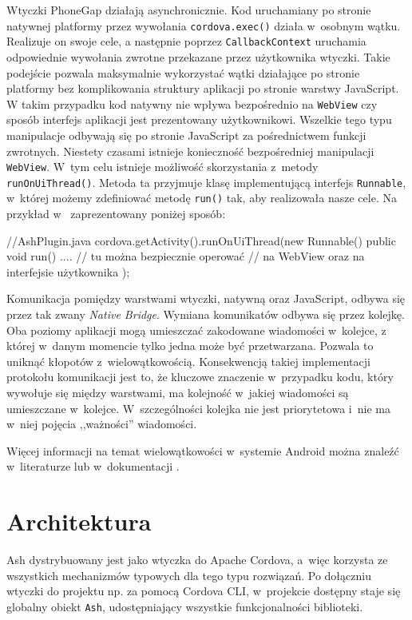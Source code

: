 \documentclass{xmgr}
\begin{document}
Wtyczki PhoneGap działają asynchronicznie. Kod uruchamiany po stronie natywnej platformy przez wywołania \texttt{cordova.exec()} działa w~osobnym wątku. Realizuje on swoje cele, a następnie poprzez \texttt{CallbackContext} uruchamia odpowiednie wywołania zwrotne przekazane przez użytkownika wtyczki. Takie podejście pozwala maksymalnie wykorzystać wątki działające po stronie platformy bez komplikowania struktury aplikacji po stronie warstwy JavaScript. W takim przypadku kod natywny nie wpływa bezpośrednio na \texttt{WebView} czy sposób interfejs aplikacji jest prezentowany użytkownikowi. Wszelkie tego typu manipulacje odbywają się po stronie JavaScript za pośrednictwem funkcji zwrotnych. Niestety czasami istnieje konieczność bezpośredniej manipulacji \texttt{WebView}. W~tym celu istnieje możliwość skorzystania z~metody \texttt{runOnUiThread()}. Metoda ta przyjmuje klasę implementującą interfejs \texttt{Runnable}, w~której możemy zdefiniować metodę \texttt{run()} tak, aby realizowała nasze cele. Na przykład w~ zaprezentowany poniżej sposób:

\begin{javascriptcode}
//AshPlugin.java
cordova.getActivity().runOnUiThread(new Runnable() {
      public void run() {
         ....        
         // tu można bezpiecznie operować 
         //    na WebView oraz na interfejsie użytkownika
      }
});
\end{javascriptcode}

Komunikacja pomiędzy warstwami wtyczki, natywną oraz JavaScript, odbywa się przez tak zwany \textit{Native Bridge}. Wymiana komunikatów odbywa się przez kolejkę. Oba poziomy aplikacji mogą umieszczać zakodowane wiadomości w~kolejce, z której w~danym momencie tylko jedna może być przetwarzana. Pozwala to uniknąć kłopotów z~wielowątkowością. Konsekwencją takiej implementacji protokołu komunikacji jest to, że kluczowe znaczenie w~przypadku kodu, który wywołuje się między warstwami,  ma kolejność w~jakiej wiadomości są umieszczane w~kolejce. W~szczególności kolejka nie jest priorytetowa i~nie ma w~niej pojęcia ,,ważności'' wiadomości.

Więcej informacji na temat wielowątkowości w~systemie Android można znaleźć w~literaturze \cite{AndroidInPractice} lub w~dokumentacji \cite{AndroidDoc}. 

\chapter{Architektura}

Ash dystrybuowany jest jako wtyczka do Apache Cordova, a~więc korzysta ze wszystkich mechanizmów typowych dla tego typu rozwiązań. Po dołączniu wtyczki do projektu np. za pomocą Cordova CLI, w~projekcie dostępny staje się globalny obiekt \texttt{Ash}, udostępniający wszystkie funkcjonalności biblioteki. 
\end{document}
